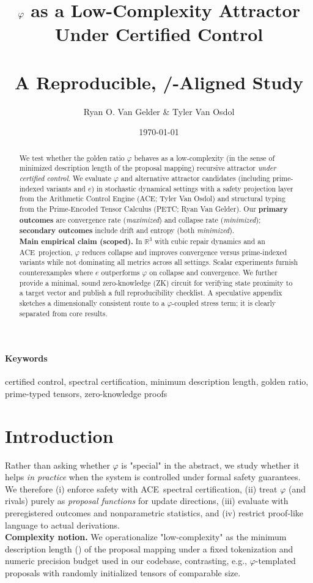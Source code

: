 \documentclass[11pt]{article}
\title{\textbf{$\phival$ as a Low-Complexity Attractor Under Certified Control}\\ \\
\large A Reproducible, \ACE/\PETC-Aligned Study}
\author{Ryan O. Van Gelder \& Tyler Van Osdol}
\date{\today}
\newcommand{\R}{\mathbb{R}}
\newcommand{\1}{\mathbf{1}}
\newcommand{\phival}{\varphi} %
\newcommand{\ACE}{\textsc{ACE}}
\newcommand{\PETC}{\textsc{PETC}}
\newcommand{\mdl}{\mathrm{MDL}}
\begin{document}
\maketitle
\begin{abstract}
We test whether the golden ratio $\phival$ behaves as a low-complexity (in the sense of minimized description length of the proposal mapping) recursive attractor \emph{under certified control}. We evaluate $\phival$ and alternative attractor candidates (including prime-indexed variants and $e$) in stochastic dynamical settings with a safety projection layer from the Arithmetic Control Engine (\ACE; Tyler Van Osdol) and structural typing from the Prime-Encoded Tensor Calculus (\PETC; Ryan Van Gelder). Our \textbf{primary outcomes} are convergence rate (\emph{maximized}) and collapse rate (\emph{minimized}); \textbf{secondary outcomes} include drift and entropy (both \emph{minimized}).\\
\textbf{Main empirical claim (scoped).} In $\R^3$ with cubic repair dynamics and an \ACE\ projection, $\phival$ reduces collapse and improves convergence versus prime-indexed variants while not dominating all metrics across all settings. Scalar experiments furnish counterexamples where $e$ outperforms $\phival$ on collapse and convergence. We further provide a minimal, sound zero-knowledge (ZK) circuit for verifying state proximity to a target vector and publish a full reproducibility checklist. A speculative appendix sketches a dimensionally consistent route to a $\phival$-coupled stress term; it is clearly separated from core results.
\end{abstract}

\paragraph{Keywords} certified control, spectral certification, minimum description length, golden ratio, prime-typed tensors, zero-knowledge proofs

\section{Introduction}
Rather than asking whether $\phival$ is "special" in the abstract, we study whether it helps \emph{in practice} when the system is controlled under formal safety guarantees. We therefore (i) enforce safety with \ACE\ spectral certification, (ii) treat $\phival$ (and rivals) purely as \emph{proposal functions} for update directions, (iii) evaluate with preregistered outcomes and nonparametric statistics, and (iv) restrict proof-like language to actual derivations.\\
\textbf{Complexity notion.} We operationalize "low-complexity" as the minimum description length (\mdl) of the proposal mapping under a fixed tokenization and numeric precision budget used in our codebase, contrasting, e.g., $\phival$-templated proposals with randomly initialized tensors of comparable size.
\end{document}

